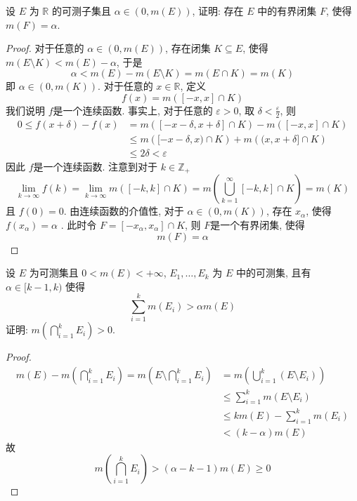 \documentclass[../main.tex]{subfiles}
\begin{document}
\begin{exercise}{}{}
设 $E$ 为 $\mathbb{R}$ 的可测子集且 $\alpha \in (0, m(E))$, 证明: 存在 $E$ 中的有界闭集 $F$, 使得 $m(F) = \alpha$.
\end{exercise}
\begin{proof}
  对于任意的 \(  \alpha \in \left( 0,m\left( E \right)  \right)   \), 存在闭集 \(  K\subseteq E  \), 使得 \(  m\left( E\setminus K \right)< m\left( E \right)-\alpha     \), 于是 \[
  \alpha < m\left( E \right)- m\left( E\setminus K \right)= m\left( E\cap K \right)= m\left( K \right)    
  \]即 \(  \alpha \in \left( 0,m\left( K \right)  \right)   \). 对于任意的 \(  x \in \mathbb{R}   \), 定义   \[
  f\left( x \right)= m\left( [-x,x]\cap K \right)  
  \]我们说明 \(  f  \)是一个连续函数. 事实上, 对于任意的 \(   \varepsilon > 0  \), 取 \(   \delta < \frac{ \varepsilon  }{2 }   \), 则  \[
  \begin{aligned}
  0\le f\left( x+  \delta  \right)-f\left( x \right)&= m\left( [-x- \delta , x+  \delta ]\cap K \right)-m\left( [-x,x]\cap K \right) \\ 
   &\le m\left( [-x- \delta ,x)\cap K \right)+ m\left( (x, x+  \delta ]\cap K \right)\\ 
    &\le 2 \delta <  \varepsilon   
  \end{aligned}    
  \]  因此 \(  f  \)是一个连续函数. 注意到对于 \(  k \in \mathbb{Z} _{+ }  \)  \[
  \lim_{k\to \infty} f\left( k \right)=  \lim_{k\to \infty}m\left( [-k,k]\cap K \right)=m\left(  \bigcup _{k= 1}^{\infty} [-k,k]\cap K \right)= m\left( K \right)  
  \]  且 \(  f\left( 0 \right)= 0   \). 由连续函数的介值性, 对于 \(  \alpha \in \left( 0,m\left( K \right)  \right)   \), 存在 \(  x_{\alpha }  \), 使得 \(  f\left( x_{\alpha } \right)= \alpha    \)    . 此时令 \(  F= [-x_{ \alpha },x_{\alpha }]\cap K  \), 则 \(  F  \)是一个有界闭集, 使得 \[
  m\left( F \right)= \alpha  
  \]  
\end{proof}
\begin{exercise}{}{}
设 $E$ 为可测集且 $0 < m(E) < +\infty$, $E_1, \dots, E_k$ 为 $E$ 中的可测集, 且有 $\alpha \in [k-1, k)$ 使得
\[
    \sum_{i=1}^k m(E_i) > \alpha m(E)
\]
证明: $m\left(\bigcap_{i=1}^k E_i\right) > 0$.
\end{exercise}
\begin{proof}
  \[
 \begin{aligned}
  m\left( E \right)-m\left( \bigcap _{i= 1}^{k}E_{i} \right)=    m\left( E\setminus \bigcap _{i= 1}^{k}E_{i} \right)&= m\left( \bigcup _{i= 1}^{k}\left( E\setminus E_{i} \right)  \right)  \\ 
    &\le \sum _{i= 1}^{k}m\left( E\setminus E_{i} \right)\\ 
     &\le k m\left( E \right)- \sum _{i= 1}^{k}m\left( E_{i} \right)\\ 
      &< \left( k-\alpha  \right)m\left( E \right)     
 \end{aligned}
   \]故 \[
   m\left( \bigcap _{i= 1}^{k}E_{i} \right)> \left( \alpha -k-1 \right)m\left( E \right)   \ge 0
   \]
\end{proof}
\end{document}
